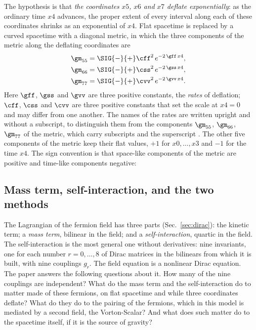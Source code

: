 The hypothesis is that \emph{the coordinates $x5$, $x6$ and $x7$ deflate exponentially}: as the
ordinary time $x4$ advances, the proper extent of every interval along each of these coordinates
shrinks as an exponential of $x4$. Flat spacetime is replaced by a curved spacetime with a diagonal
metric, in which the three components of the metric along the deflating coordinates are
\begin{equation}
\begin{aligned}
\gm_{55}&=\SIG{-}{+}\cff^{2}\,e^{-2\,\gff\,x4},\\
\gm_{66}&=\SIG{-}{+}\css^{2}\,e^{-2\,\gss\,x4},\\
\gm_{77}&=\SIG{-}{+}\cvv^{2}\,e^{-2\,\gvv\,x4}.
\end{aligned}
\label{eq:hyp}
\end{equation}
Here $\gff$, $\gss$ and $\gvv$ are three positive constants, the \emph{rates} of deflation; $\cff$,
$\css$ and $\cvv$ are three positive constants that set the scale at $x4=0$ and may differ from one
another. The names of the rates are written upright and without a subscript, to distinguish them
from the components $\gm_{55}$, $\gm_{66}$, $\gm_{77}$ of the metric, which carry subscripts and the
superscript . The other five components of the metric keep their flat values,
$+1$ for $x0,\dots,x3$ and $-1$ for the time $x4$. The sign convention is that space-like components
of the metric are positive and time-like components negative: 

\subsection{Mass term, self-interaction, and the two methods}

The Lagrangian of the fermion field has three parts (Sec.~\ref{sec:dirac}): the kinetic term; a
\emph{mass term}, bilinear in the field; and a \emph{self-interaction}, quartic in the field. The
self-interaction is the most general one without derivatives: nine invariants, one for each number
$r=0,\dots,8$ of Dirac matrices in the bilinears from which it is built, with nine couplings $g_r$.
The field equation is a nonlinear Dirac equation. The paper answers the following questions about
it. How many of the nine couplings are independent? What do the mass term and the self-interaction
do to matter made of these fermions, on flat spacetime and while three coordinates deflate? What do
they do to the pairing of the fermions, which in this model is mediated by a second field, the
Vorton-Scalar? And what does such matter do to the spacetime itself, if it is the source of gravity?

